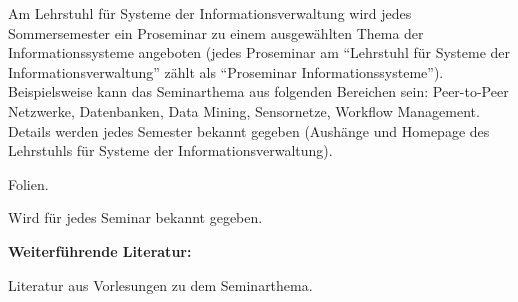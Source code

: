 \begin{course}
\begin{learningoutcomes}
\end{learningoutcomes}

\begin{content}
Am Lehrstuhl für Systeme der Informationsverwaltung wird jedes Sommersemester ein Proseminar zu einem ausgewählten Thema der Informationssysteme angeboten (jedes Proseminar am “Lehrstuhl für Systeme der Informationsverwaltung” zählt als “Proseminar Informationssysteme”). Beispielsweise kann das Seminarthema aus folgenden Bereichen sein: Peer-to-Peer Netzwerke, Datenbanken, Data Mining, Sensornetze, Workflow Management. Details werden jedes Semester bekannt gegeben (Aushänge und Homepage des Lehrstuhls für Systeme der Informationsverwaltung).


\end{content}

\begin{media}Folien.

\end{media}

\begin{literature}Wird für jedes Seminar bekannt gegeben.

 

\textbf{Weiterführende Literatur:}

 

Literatur aus Vorlesungen zu dem Seminarthema.

\end{literature}



\end{course}